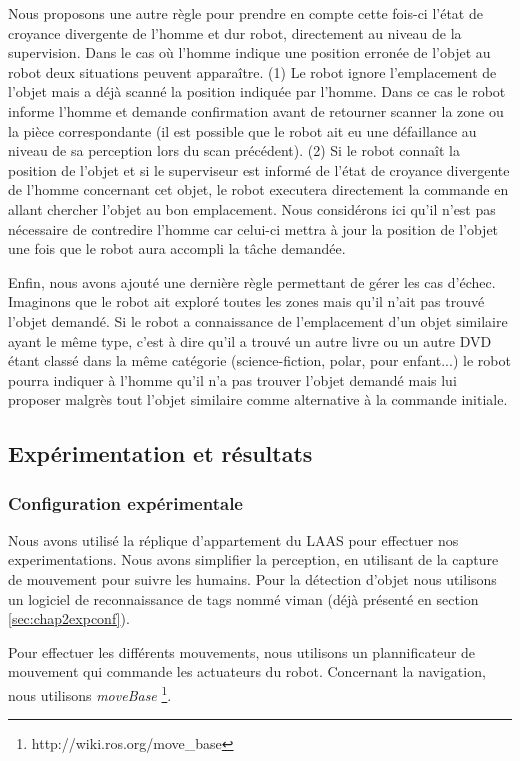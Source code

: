 \documentclass[a4paper,11pt,twoside]{StyleThese}
\begin{document}
Nous proposons une autre règle pour prendre en compte cette fois-ci l'état de croyance divergente de l'homme et dur robot, directement au niveau de la supervision.
Dans le cas où l'homme indique une position erronée de l'objet au robot deux situations peuvent apparaître. (1) Le robot ignore l'emplacement de l'objet mais a déjà scanné la position indiquée par l'homme. Dans ce cas le robot informe l'homme et demande confirmation avant de retourner scanner la zone ou la pièce correspondante (il est possible que le robot ait eu une défaillance au niveau de sa perception lors du scan précédent). (2) Si le robot connaît la position de l'objet et si le superviseur est informé de l'état de croyance divergente de l'homme concernant cet objet, le robot executera directement la commande en allant chercher l'objet au bon emplacement. Nous considérons ici qu'il n'est pas nécessaire de contredire l'homme car celui-ci mettra à jour la position de l'objet une fois que le robot aura accompli la tâche demandée.


Enfin, nous avons ajouté une dernière règle permettant de gérer les cas d'échec.
Imaginons que le robot ait exploré toutes les zones mais qu'il n'ait pas trouvé l'objet demandé. Si le robot a connaissance de l'emplacement d'un objet similaire ayant le même type, c'est à dire qu'il a trouvé un autre livre ou un autre DVD étant classé dans la même catégorie (science-fiction, polar, pour enfant...) le robot pourra indiquer à l'homme qu'il n'a pas trouver l'objet demandé mais lui proposer malgrès tout l'objet similaire comme alternative à la commande initiale.




\subsection{Expérimentation et résultats}

\subsubsection{Configuration expérimentale}
Nous avons utilisé la réplique d'appartement du LAAS pour effectuer nos experimentations. Nous avons simplifier la perception, en utilisant de la capture de mouvement pour suivre les humains. Pour la détection d'objet nous utilisons un logiciel de reconnaissance de tags nommé viman (déjà présenté en section \ref{sec:chap2expconf}).


Pour effectuer les différents mouvements, nous utilisons un plannificateur de mouvement\cite{Sisbot2008} qui commande les actuateurs du robot.
Concernant la navigation, nous utilisons \textit{moveBase} \footnote{http://wiki.ros.org/move\_base}.
\end{document}
